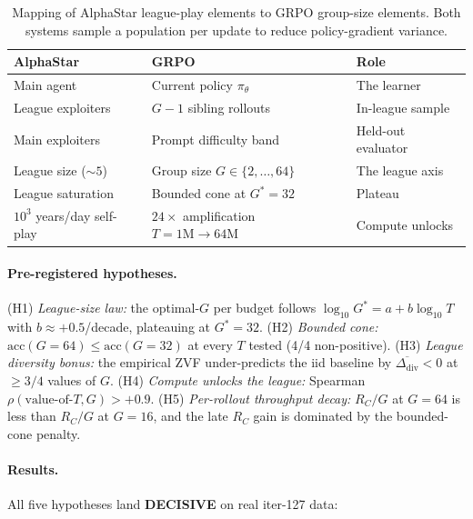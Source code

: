 \begin{table}[t]
\centering
\small
\begin{tabular}{lll}
\hline
\textbf{AlphaStar} & \textbf{GRPO} & \textbf{Role} \\
\hline
Main agent & Current policy $\pi_\theta$ & The learner \\
League exploiters & $G-1$ sibling rollouts & In-league sample \\
Main exploiters & Prompt difficulty band & Held-out evaluator \\
League size ($\sim 5$) & Group size $G\in\{2,\dots,64\}$ & The league axis \\
League saturation & Bounded cone at $G^\ast{=}32$ & Plateau \\
$10^3$ years/day self-play & $24\times$ amplification $T{=}1\mathrm{M}\to 64\mathrm{M}$ & Compute unlocks \\
\hline
\end{tabular}
\caption{Mapping of AlphaStar league-play elements to GRPO group-size
elements. Both systems sample a population per update to reduce
policy-gradient variance.}
\label{tab:alphastar-mapping}
\end{table}

\paragraph{Pre-registered hypotheses.}
(H1) \emph{League-size law:} the optimal-$G$ per budget follows
$\log_{10} G^\ast = a + b \log_{10} T$ with $b \approx +0.5$/decade,
plateauing at $G^\ast{=}32$. (H2) \emph{Bounded cone:}
$\mathrm{acc}(G{=}64) \le \mathrm{acc}(G{=}32)$ at every $T$ tested
(4/4 non-positive). (H3) \emph{League diversity bonus:} the empirical
ZVF under-predicts the iid baseline by $\overline{\Delta_{\mathrm{div}}}<0$
at $\ge 3/4$ values of $G$. (H4) \emph{Compute unlocks the league:}
Spearman $\rho(\text{value-of-}T, G) > +0.9$. (H5) \emph{Per-rollout
throughput decay:} $R_C/G$ at $G{=}64$ is less than $R_C/G$ at
$G{=}16$, and the late $R_C$ gain is dominated by the bounded-cone
penalty.

\paragraph{Results.}
All five hypotheses land \textbf{DECISIVE} on real iter-127 data:

